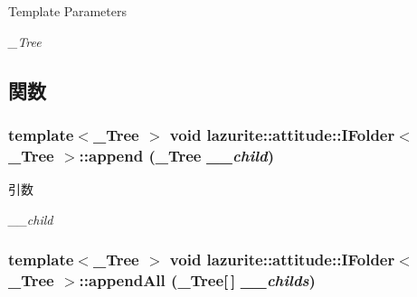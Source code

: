 \begin{DoxyTemplParams}{Template Parameters}
\item[{\em \_\-Tree}]\end{DoxyTemplParams}


\subsection{関数}
\hypertarget{interfacelazurite_1_1attitude_1_1_i_folder_3_01___tree_01_4_a677fc98e5b866d84a7a5821adb4dd323}{
\subsubsection[{append}]{\setlength{\rightskip}{0pt plus 5cm}template$<$\_\-Tree $>$ void lazurite::attitude::IFolder$<$ \_\-Tree $>$::append (\_\-Tree {\em \_\-\_\-child})}}
\label{interfacelazurite_1_1attitude_1_1_i_folder_3_01___tree_01_4_a677fc98e5b866d84a7a5821adb4dd323}

\begin{DoxyParams}{引数}
\item[{\em \_\-\_\-child}]\end{DoxyParams}
\hypertarget{interfacelazurite_1_1attitude_1_1_i_folder_3_01___tree_01_4_a63afb8adadc9ca974a35b0b68f28eb65}{
\subsubsection[{appendAll}]{\setlength{\rightskip}{0pt plus 5cm}template$<$\_\-Tree $>$ void lazurite::attitude::IFolder$<$ \_\-Tree $>$::appendAll (\_\-Tree\mbox{[}$\,$\mbox{]} {\em \_\-\_\-childs})}}
\label{interfacelazurite_1_1attitude_1_1_i_folder_3_01___tree_01_4_a63afb8adadc9ca974a35b0b68f28eb65}

